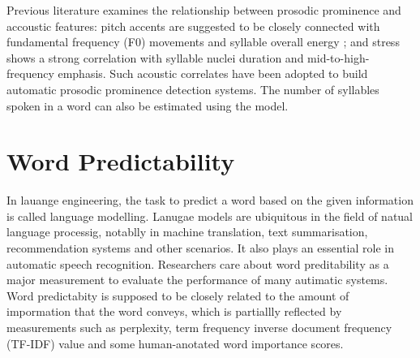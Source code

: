Previous literature examines the relationship between prosodic prominence and accoustic features: pitch accents are suggested to be closely connected with fundamental frequency (F0) movements and syllable overall energy \citep{Bagshaw1994, Streefkerk1999, Brenier2005}; and stress shows a strong correlation with syllable nuclei duration and mid-to-high-frequency emphasis\citep{Sluijter1996, Tamburini2003}. Such acoustic correlates have been adopted to build automatic prosodic prominence detection systems\citep{Tamburini2003}. The number of syllables spoken in a word can also be estimated using the \citet{DeJong2009} model. 


%
%

\section{Word Predictability}
In lauange engineering, the task to predict a word based on the given information is called language modelling. Lanugae models are ubiquitous in the field of natual language processig, notablly in machine translation, text summarisation, recommendation systems and other scenarios. It also plays an essential role in automatic speech recognition. Researchers care about word preditability as a major measurement to evaluate the performance of many autimatic systems. Word predictabity is supposed to be closely related to the amount of impormation that the word conveys, which is partiallly reflected by measurements such as perplexity, term frequency inverse document frequency (TF-IDF) value and some human-anotated word importance scores.

